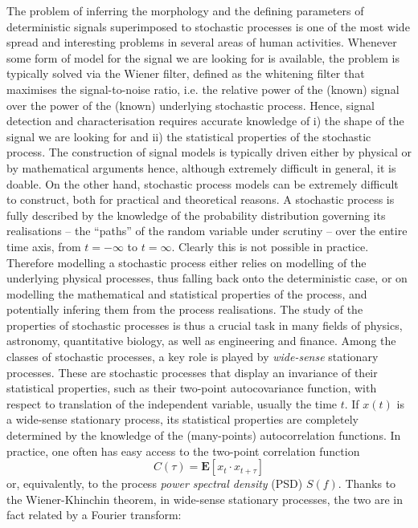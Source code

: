 \documentclass[epj,nopacs]{svjour}
\begin{document}
The problem of inferring the morphology and the defining parameters of deterministic signals superimposed to stochastic processes is one of the most wide spread and interesting problems in several areas of human activities. Whenever some form of model for the signal we are looking for is available, the problem is typically solved via the Wiener filter, defined as the whitening filter that maximises the signal-to-noise ratio, i.e. the relative power of the (known) signal over the power of the (known) underlying stochastic process. Hence, signal detection and characterisation requires accurate knowledge of i) the shape of the signal we are looking for and ii) the statistical properties of the stochastic process. The construction of signal models is typically driven either by physical or by mathematical arguments hence, although extremely difficult in general, it is doable. On the other hand, stochastic process models can be extremely difficult to construct, both for practical and theoretical reasons. A stochastic process is fully described by the knowledge of the probability distribution governing its realisations -- the ``paths'' of the random variable under scrutiny -- over the entire time axis, from $t=-\infty$ to $t=\infty$. Clearly this is not possible in practice. Therefore modelling a stochastic process either relies on modelling of the underlying physical processes, thus falling back onto the deterministic case, or on modelling the mathematical and statistical properties of the process, and potentially infering them from the process realisations. The study of the properties of stochastic processes is thus a crucial task in many fields of physics, astronomy, quantitative biology, as well as engineering and finance. Among the classes of stochastic processes, a key role is played by \textit{wide-sense} stationary processes. These are stochastic processes that display an invariance of their statistical properties, such as their two-point autocovariance function, with respect to translation of the independent variable, usually the time $t$. If $x(t)$ is a wide-sense stationary process, its statistical properties are completely determined by the knowledge of the (many-points) autocorrelation functions. In practice, one often has easy access to the two-point correlation function 
\begin{equation}
	C(\tau) = \mathbf{E}[x_t \cdot x_{t+\tau}]
\end{equation}
or, equivalently, to the process \emph{power spectral density} (PSD) $S(f)$. Thanks to the Wiener-Khinchin theorem, in wide-sense stationary processes, the two are in fact related by a Fourier transform: 
\end{document}
